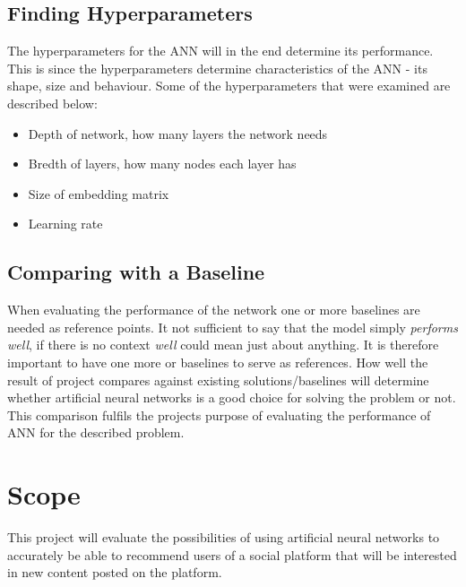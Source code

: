 \subsection{Finding Hyperparameters}
The hyperparameters for the ANN will in the end determine its performance. This is since the hyperparameters determine characteristics of the ANN - its shape, size and behaviour. Some of the hyperparameters that were  examined are described below:
\vspace*{0.25cm}
\begin{itemize}
    \item Depth of network, how many layers the network needs
    \item Bredth of layers, how many nodes each layer has
    \item Size of embedding matrix
    \item Learning rate
\end{itemize}

\subsection{Comparing with a Baseline}
When evaluating the performance of the network one or more baselines are needed as reference points. It not sufficient to say that the model simply \textit{performs well}, if there is no context \textit{well} could mean just about anything. It is therefore important to have one more or baselines to serve as references. How well the result of project compares against existing solutions/baselines will determine whether artificial neural networks is a good choice for solving the problem or not. This comparison fulfils the projects purpose of evaluating the performance of ANN for the described problem.

\section{Scope}
This project will evaluate the possibilities of using artificial neural networks to accurately be able to recommend users of a social platform that will be interested in new content posted on the platform.

